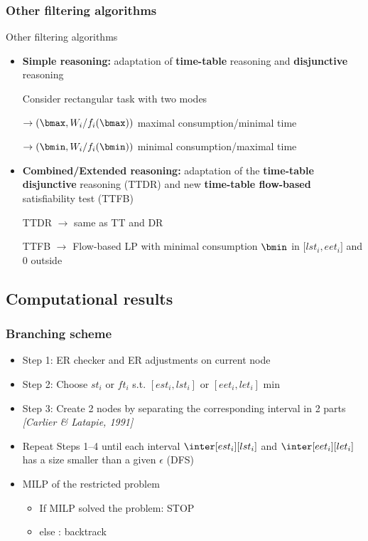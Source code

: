 \subsubsection{Other filtering algorithms}

\begin{frame}{Other filtering algorithms}
  \vfill
  \begin{itemize}
  \item {\bf \color{blue!80!black!80} Simple reasoning: } adaptation of
    {\bf time-table} reasoning and {\bf disjunctive} reasoning
    \vfill
    {\color{gray!80!black!80}{\it Idea: } Consider rectangular task with two modes

      $\rightarrow (\bmax, W_i/f_i(\bmax))$ maximal consumption/minimal time

      $\rightarrow (\bmin, W_i/f_i(\bmin))$ minimal consumption/maximal
      time}
    \vfill
    \pause
  \item {\bf \color{blue!80!black!80} Combined/Extended reasoning: }
    adaptation of the {\bf time-table disjunctive} reasoning (TTDR) and
    new {\bf time-table flow-based} satisfiability test (TTFB)
    \vfill
    {\color{gray!80!black!80}{\it Idea: } TTDR $\rightarrow$ same as TT and DR
      
      TTFB $\rightarrow$ Flow-based LP with minimal consumption $\bmin$ in
      ${[}lst_i ,eet_i{]}$ and $0$ outside}
  \end{itemize}
\end{frame}


  \subsection{Computational results}

  \begin{frame}
    \frametitle{Branching scheme }
    \begin{itemize}
      \vfill
    \item Step 1: ER checker and ER adjustments on current node 
      \vfill    
    \item Step 2: Choose $st_i$ or $ft_i$ s.t. $[est_i,lst_i]$ or
      $[eet_i,let_i]$ min
      \vfill
    \item Step 3: Create 2 nodes by separating the corresponding
      interval in 2 parts {\small \it \color{gray!50!black!50} [Carlier \& Latapie, 1991]}
      \vfill
    \item{\color{red!80!black!80} Repeat Steps 1--4 until each interval $\inter[est_i][lst_i]$ and $\inter[eet_i][let_i]$ has a size smaller than a given $\epsilon$ (DFS)}
      \vfill
    \item MILP of the restricted problem
      \begin{itemize}
      \item If MILP solved the problem: STOP
      \item else : backtrack
      \end{itemize}
    \end{itemize}
    \vfill
  \end{frame}


